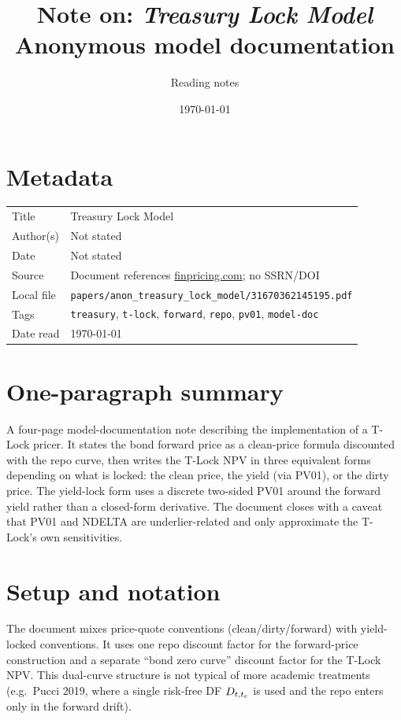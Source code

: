 \documentclass[11pt,a4paper]{article}
\title{Note on: \emph{Treasury Lock Model}\\
       \large Anonymous model documentation}
\author{Reading notes}
\date{\today}
\begin{document}
\maketitle

\section*{Metadata}
\begin{tabular}{@{}p{3.5cm}p{11cm}@{}}
\toprule
Title           & Treasury Lock Model \\
Author(s)       & Not stated \\
Date            & Not stated \\
Source          & Document references \url{finpricing.com}; no SSRN/DOI \\
Local file      & \texttt{papers/anon\_treasury\_lock\_model/31670362145195.pdf} \\
Tags            & \texttt{treasury}, \texttt{t-lock}, \texttt{forward},
                  \texttt{repo}, \texttt{pv01}, \texttt{model-doc} \\
Date read       & \today \\
\bottomrule
\end{tabular}

\section*{One-paragraph summary}
A four-page model-documentation note describing the implementation of a
T-Lock pricer. It states the bond forward price as a clean-price formula
discounted with the repo curve, then writes the T-Lock NPV in three
equivalent forms depending on what is locked: the clean price, the
yield (via PV01), or the dirty price. The yield-lock form uses a
discrete two-sided PV01 around the forward yield rather than a
closed-form derivative. The document closes with a caveat that PV01
and NDELTA are underlier-related and only approximate the T-Lock's own
sensitivities.

\section{Setup and notation}

The document mixes price-quote conventions (clean/dirty/forward) with
yield-locked conventions. It uses one repo discount factor for the
forward-price construction and a separate ``bond zero curve''
discount factor for the T-Lock NPV. This dual-curve structure is not
typical of more academic treatments (e.g.\ Pucci 2019, where a single
risk-free DF $D_{t,t_e}$ is used and the repo enters only in the
forward drift).
\end{document}
